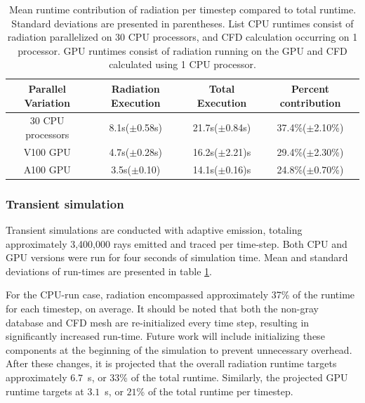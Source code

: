 \begin{table}[h!]
\centering
\caption{Mean runtime contribution of radiation per timestep compared to total runtime. Standard deviations are presented in parentheses. List CPU runtimes consist of radiation parallelized on 30 CPU processors, and CFD calculation occurring on 1 processor. GPU runtimes consist of radiation running on the GPU and CFD calculated using 1 CPU processor.}
\begin{tabular}{c c c c} 
 \hline
 Parallel Variation & Radiation Execution & Total Execution & Percent contribution \\ [0.5ex] 
 \hline
 30 CPU processors & 8.1s($\pm{}$0.58s) & 21.7s($\pm{}$0.84s) & 37.4\%($\pm{}$2.10\%) \\
 V100 GPU & 4.7s($\pm$0.28s) & 16.2s($\pm$2.21)s & 29.4\%($\pm$2.30\%) \\
 A100 GPU & 3.5s($\pm$0.10) & 14.1s($\pm$0.16)s & 24.8\%($\pm$0.70\%) \\
 \hline
\end{tabular}
\label{table:PoolFireTransient_runtime_table_1rpc}
\end{table}

\subsubsection{Transient simulation}
Transient simulations are  conducted with adaptive emission, totaling approximately 3,400,000 rays emitted and traced per time-step.
Both CPU and GPU versions were run for four seconds of simulation time. Mean and standard deviations of run-times are presented in table \ref{table:PoolFireTransient_runtime_table_1rpc}. 

For the CPU-run case, radiation encompassed approximately 37\% of the runtime for each timestep, on average.
It should be noted that both the non-gray database and CFD mesh are re-initialized every time step, resulting in significantly increased run-time. Future work will include initializing these components at the beginning of the simulation to prevent unnecessary overhead.
After these changes, it is projected that the overall radiation runtime targets approximately $6.7$~s, or $33$\% of the total runtime.
Similarly, the projected GPU runtime targets at $3.1$~s, or $21$\% of the total runtime per timestep.






